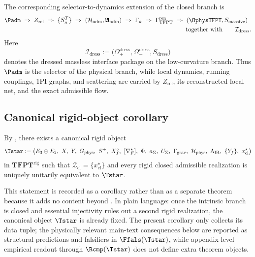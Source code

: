The corresponding selector-to-dynamics extension of the closed branch is
\[
\Padm
\;\Rightarrow\;
Z_{\mathrm{rel}}
\;\Rightarrow\;
\{S_n^T\}
\;\Rightarrow\;
(\mathcal H_{\mathrm{adm}},\mathfrak A_{\mathrm{adm}})
\;\Rightarrow\;
\Gamma_k
\;\Rightarrow\;
\begin{aligned}[t]
\Gamma_{\mathrm{TFPT}}^{\mathrm{ren}}
&\;\Rightarrow\;
(\OphysTFPT,S_{\mathrm{massive}})\\
&\qquad\text{together with}\qquad
\mathcal I_{\mathrm{dress}}.
\end{aligned}
\]
Here
\[
\mathcal I_{\mathrm{dress}}
:=
\bigl(\Omega_+^{\mathrm{dress}},\Omega_-^{\mathrm{dress}},S_{\mathrm{dress}}\bigr)
\]
denotes the dressed massless interface package on the low-curvature branch.
Thus $\Padm$ is the selector of the physical branch, while local dynamics, running couplings, 1PI
graphs, and scattering are carried by $Z_{\mathrm{rel}}$, its reconstructed local net, and the
exact admissible flow.

\subsection{Canonical rigid-object corollary}

\begin{corollary}
\label{cor:canonical-rigid-object}
By ,
there exists a canonical rigid object
\[
\Tstar
:=
\bigl(
E_3\oplus E_2,\ X,\ Y,\ G_{\mathrm{phys}},\ S^+,\ X_f^\circ,\ [\nabla_F^\star],\ \Phi,\ a_\Sigma,\ U_\Sigma,\ \Gamma_{\mathrm{grav}},\ \mathcal H_{\mathrm{phys}},\ \Lambda_{\mathrm{IR}},\ \{Y_f\},\ x_{\mathrm{cl}}^\star
\bigr)
\]
in $\mathbf{TFPT}^{\mathrm{rig}}$ such that $\mathcal Z_{\mathrm{cl}}=\{x_{\mathrm{cl}}^\star\}$
and every rigid closed admissible realization is uniquely unitarily equivalent to $\Tstar$.
\end{corollary}

\begin{remark}
This statement is recorded as a corollary rather than as a separate theorem because it adds no
content beyond .
In plain language: once the intrinsic branch is closed and essential injectivity rules out a
second rigid realization, the canonical object $\Tstar$ is already fixed. The present corollary
only collects its data tuple; the physically relevant main-text consequences below are reported as
structural predictions and falsifiers in $\Ffals(\Tstar)$, while appendix-level empirical readout
through $\Rcmp(\Tstar)$ does not define extra theorem objects.
\end{remark}

